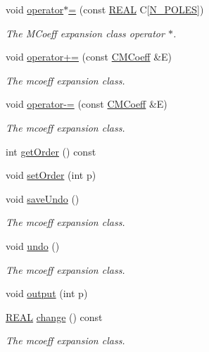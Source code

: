 \begin{DoxyCompactItemize}
\item 
void \hyperlink{classCMCoeff_a63d33423be766832461e5e20a0f21f66}{operator$\ast$=} (const \hyperlink{util_8h_a5821460e95a0800cf9f24c38915cbbde}{R\-E\-A\-L} C\mbox{[}\hyperlink{mcoeff_8h_ac23f9c13c5d07d9ce386f7a830c35e5a}{N\-\_\-\-P\-O\-L\-E\-S}\mbox{]})
\begin{DoxyCompactList}\small\item\em The M\-Coeff expansion class operator $\ast$. \end{DoxyCompactList}\item 
void \hyperlink{classCMCoeff_ac889bdd0230f6c3f11b8af06915410fe}{operator+=} (const \hyperlink{classCMCoeff}{C\-M\-Coeff} \&E)
\begin{DoxyCompactList}\small\item\em The mcoeff expansion class. \end{DoxyCompactList}\item 
void \hyperlink{classCMCoeff_a28161819e17994b61395e9ddc8532040}{operator-\/=} (const \hyperlink{classCMCoeff}{C\-M\-Coeff} \&E)
\begin{DoxyCompactList}\small\item\em The mcoeff expansion class. \end{DoxyCompactList}\item 
int \hyperlink{classCMCoeff_a4ca84260f5a63a33547ebce310b21c32}{get\-Order} () const 
\item 
void \hyperlink{classCMCoeff_a815a4d1f74b217ea54d9f05f6734004f}{set\-Order} (int p)
\item 
void \hyperlink{classCMCoeff_a99771333750460a0ba9c97f03bdaa6b9}{save\-Undo} ()
\begin{DoxyCompactList}\small\item\em The mcoeff expansion class. \end{DoxyCompactList}\item 
void \hyperlink{classCMCoeff_ae75856578c3de42f457cc6e2af17d1d4}{undo} ()
\begin{DoxyCompactList}\small\item\em The mcoeff expansion class. \end{DoxyCompactList}\item 
void \hyperlink{classCMCoeff_afe4e3e3719dc0808108353ab20b05c23}{output} (int p)
\item 
\hyperlink{util_8h_a5821460e95a0800cf9f24c38915cbbde}{R\-E\-A\-L} \hyperlink{classCMCoeff_a1bf2b3f4bba7f938a9d9d32855737699}{change} () const 
\begin{DoxyCompactList}\small\item\em The mcoeff expansion class. \end{DoxyCompactList}\end{DoxyCompactItemize}
